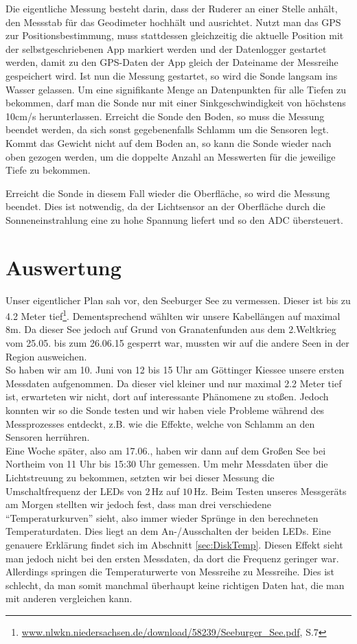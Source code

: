 \documentclass[12pt,a4paper,titlepage,headinclude,bibtotoc]{scrartcl}
\numberwithin{equation}{subsection}
\begin{document}
Die eigentliche Messung besteht darin, dass der Ruderer an einer Stelle anhält, den Messstab für das Geodimeter hochhält und ausrichtet.
Nutzt man das GPS zur Positionsbestimmung, muss stattdessen gleichzeitig die aktuelle Position mit der selbstgeschriebenen App markiert werden und der Datenlogger gestartet werden, damit zu den GPS-Daten der App gleich der Dateiname der Messreihe gespeichert wird.
Ist nun die Messung gestartet, so wird die Sonde langsam ins Wasser gelassen.
Um eine signifikante Menge an Datenpunkten für alle Tiefen zu bekommen, darf man die Sonde nur mit einer Sinkgeschwindigkeit von höchstens 10cm/s herunterlassen.
Erreicht die Sonde den Boden, so muss die Messung beendet werden, da sich sonst gegebenenfalls Schlamm um die Sensoren legt.
Kommt das Gewicht nicht auf dem Boden an, so kann die Sonde wieder nach oben gezogen werden, um die doppelte Anzahl an Messwerten für die jeweilige Tiefe zu bekommen.

Erreicht die Sonde in diesem Fall wieder die Oberfläche, so wird die Messung beendet.
Dies ist notwendig, da der Lichtsensor an der Oberfläche durch die Sonneneinstrahlung eine zu hohe Spannung liefert und so den ADC übersteuert.


\section{Auswertung}
\label{sec:auswertung}

Unser eigentlicher Plan sah vor, den Seeburger See zu vermessen.
Dieser ist bis zu 4.2 Meter tief\footnote{\url{www.nlwkn.niedersachsen.de/download/58239/Seeburger\_See.pdf}, S.7}.
Dementsprechend wählten wir unsere Kabellängen auf maximal 8\si{\meter}.
Da dieser See jedoch auf Grund von Granatenfunden aus dem 2.Weltkrieg vom 25.05. bis zum 26.06.15 gesperrt war, mussten wir auf die andere Seen in der Region ausweichen.\\
So haben wir am 10. Juni von 12 bis 15 Uhr am Göttinger Kiessee unsere ersten Messdaten aufgenommen.
Da dieser viel kleiner und nur maximal 2.2 Meter tief ist, erwarteten wir nicht, dort auf interessante Phänomene zu stoßen.
Jedoch konnten wir so die Sonde testen und wir haben viele Probleme während des Messprozesses entdeckt, z.B. wie die Effekte, welche von Schlamm an den Sensoren herrühren.\\
Eine Woche später, also am 17.06., haben wir dann auf dem Großen See bei Northeim von 11 Uhr bis 15:30 Uhr gemessen.
Um mehr Messdaten über die Lichtstreuung zu bekommen, setzten wir bei dieser Messung die Umschaltfrequenz der LEDs von $2\,$Hz auf $10\,$Hz.
Beim Testen unseres Messgeräts am Morgen stellten wir jedoch fest, dass man drei verschiedene "`Temperaturkurven"' sieht, also immer wieder Sprünge in den berechneten Temperaturdaten.
Dies liegt an dem An-/Ausschalten der beiden LEDs.
Eine genauere Erklärung findet sich im Abschnitt \ref{sec:DiskTemp}.
Diesen Effekt sieht man jedoch nicht bei  den ersten Messdaten, da dort die Frequenz geringer war.
Allerdings springen die Temperaturwerte von Messreihe zu Messreihe.
Dies ist schlecht, da man somit manchmal überhaupt keine richtigen Daten hat, die man mit anderen vergleichen kann.
\end{document}
